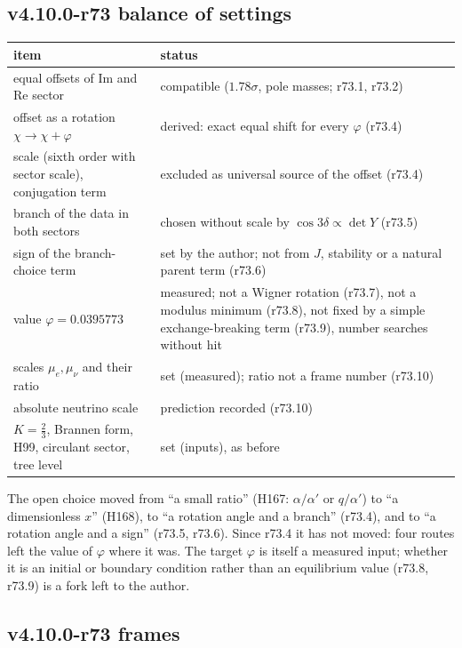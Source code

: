 \subsection*{v4.10.0-r73 balance of settings}
\label{subsec:v4100-r73-balance}

\begin{center}
\small
\begin{tabular}{@{}>{\raggedright\arraybackslash}p{}>{\raggedright\arraybackslash}p{}@{}}
\toprule
item & status\\
\midrule
equal offsets of Im and Re sector & compatible (\(1.78\sigma\), pole masses; r73.1, r73.2)\\
offset as a rotation \(\chi\to\chi+\varphi\) & derived: exact equal shift for every \(\varphi\) (r73.4)\\
scale (sixth order with sector scale), conjugation term & excluded as universal source of the offset (r73.4)\\
branch of the data in both sectors & chosen without scale by \(\cos3\delta\propto\det Y\) (r73.5)\\
sign of the branch-choice term & set by the author; not from \(J\), stability or a natural parent term (r73.6)\\
value \(\varphi=0.0395773\) & measured; not a Wigner rotation (r73.7), not a modulus minimum (r73.8), not fixed by a simple exchange-breaking term (r73.9), number searches without hit\\
scales \(\mu_e,\mu_\nu\) and their ratio & set (measured); ratio not a frame number (r73.10)\\
absolute neutrino scale & prediction recorded (r73.10)\\
\(K=\tfrac23\), Brannen form, H99, circulant sector, tree level & set (inputs), as before\\
\bottomrule
\end{tabular}
\end{center}
The open choice moved from ``a small ratio'' (H167: \(\alpha/\alpha'\) or \(q/\alpha'\)) to ``a dimensionless \(x\)'' (H168), to ``a rotation angle and a
branch'' (r73.4), and to ``a rotation angle and a sign'' (r73.5, r73.6).  Since r73.4 it has not moved: four routes left the value of \(\varphi\)
where it was.  The target \(\varphi\) is itself a measured input; whether it is an initial or boundary condition rather than an equilibrium value
(r73.8, r73.9) is a fork left to the author.

\subsection*{v4.10.0-r73 frames}
\label{subsec:v4100-r73-frames}

